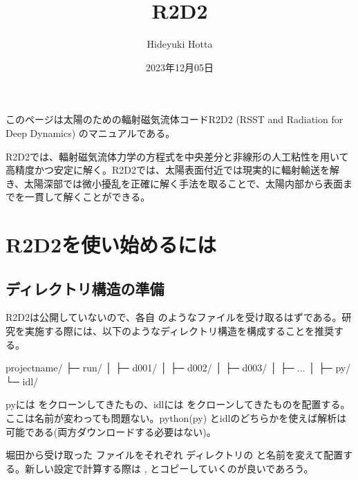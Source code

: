 \documentclass[letterpaper,10pt,dvipdfmx,report]{sphinxmanual}
\title{R2D2}
\date{2023年12月05日}
\author{Hideyuki Hotta}
\let\sphinxpxdimen\pdfpxdimen\else\newdimen\sphinxpxdimen
\begin{document}
\pagestyle{empty}
\sphinxmaketitle
\pagestyle{plain}
\sphinxtableofcontents
\pagestyle{normal}
\label{\detokenize{index::doc}}


\sphinxAtStartPar
このページは太陽のための輻射磁気流体コードR2D2 (RSST and Radiation for Deep Dynamics)
のマニュアルである。

\sphinxAtStartPar
{}

\sphinxAtStartPar
R2D2では、輻射磁気流体力学の方程式を中央差分と非線形の人工粘性を用いて高精度かつ安定に解く。R2D2では、太陽表面付近では現実的に輻射輸送を解き、太陽深部では微小擾乱を正確に解く手法を取ることで、太陽内部から表面までを一貫して解くことができる。

\noindent\sphinxincludegraphics[width=350\sphinxpxdimen]{{R2D2_logo_red}.png}

\sphinxstepscope


\chapter{R2D2を使い始めるには}
\label{\detokenize{start:r2d2}}\label{\detokenize{start::doc}}

\section{ディレクトリ構造の準備}
\label{\detokenize{start:id1}}
\sphinxAtStartPar
R2D2は公開していないので、各自  のようなファイルを受け取るはずである。研究を実施する際には、以下のようなディレクトリ構造を構成することを推奨する。

\begin{sphinxVerbatim}[commandchars=\\\{\}]
project\PYGZus{}name/
           ├─ run/
           │    ├─ d001/
           │    ├─ d002/
           │    ├─ d003/
           │    ├─ ...
           │
           ├─ py/
           └─ idl/
\end{sphinxVerbatim}

\sphinxAtStartPar
pyには  をクローンしてきたもの、idlには  をクローンしてきたものを配置する。ここは名前が変わっても問題ない。python(py) とidlのどちらかを使えば解析は可能である(両方ダウンロードする必要はない)。

\sphinxAtStartPar
堀田から受け取った  ファイルをそれぞれ  ディレクトリの  と名前を変えて配置する。新しい設定で計算する際は ,  とコピーしていくのが良いであろう。
\end{document}
